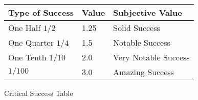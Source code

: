 \begin{SHTable}[H]
	\begin{tabular}{l|l|l}
	Type of Success				& Value & Subjective Value	\\
	\hline
	One Half \( 1/2 \)			& 1.25	& Solid Success		\\
        One Quarter \( 1/4 \) 	& 1.5	& Notable Success	\\
        One Tenth \( 1/10 \) 	& 2.0	& Very Notable Success	\\
        \(1/100\) 				& 3.0	& Amazing Success	\\
	\end{tabular}
	\caption{Critical Success Table}\label{Table:CriticalSuccess}
\end{SHTable}
